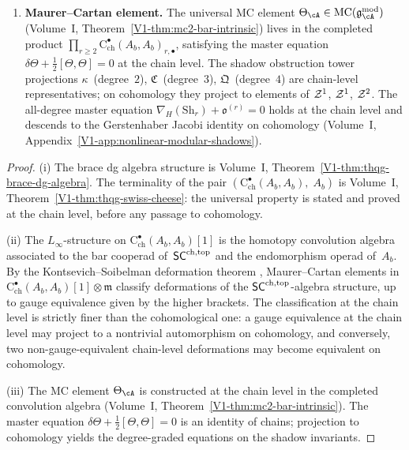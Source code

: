 \begin{theorem}
\begin{enumerate}[label=\textup{(\roman*)}]
\item \textbf{Maurer--Cartan element.}
 The universal MC element\/
 $\Theta_\cA \in \MC(\gAmod)$
 \textup{(}Volume~I,
 Theorem~\textup{\ref*{V1-thm:mc2-bar-intrinsic}}\textup{)}
 lives in the completed product\/
 $\prod_{r \ge 2}
 \mathrm{C}^\bullet_{\mathrm{ch}}(A_b, A_b)_{r,\bullet}$,
 satisfying the master equation
 $\delta \Theta + \tfrac{1}{2}[\Theta, \Theta] = 0$
 at the chain level. The shadow obstruction tower projections
 $\kappa$~\textup{(}degree~$2$\textup{)},
 $\mathfrak{C}$~\textup{(}degree~$3$\textup{)},
 $\mathfrak{Q}$~\textup{(}degree~$4$\textup{)}
 are chain-level representatives\textup{;} on cohomology they
 project to elements of\/ $\mathcal{Z}^1$, $\mathcal{Z}^1$, $\mathcal{Z}^2$.
 The all-degree master equation
 $\nabla_{H}(\mathrm{Sh}_r) + \mathfrak{o}^{(r)} = 0$
 holds at the chain level and descends to the Gerstenhaber Jacobi
 identity on cohomology
 \textup{(}Volume~I, Appendix~\textup{\ref*{V1-app:nonlinear-modular-shadows}}\textup{)}.
\end{enumerate}
\end{theorem}

\begin{proof}
(i) The brace dg algebra structure is
Volume~I, Theorem~\ref*{V1-thm:thqg-brace-dg-algebra}.
The terminality of the pair
$(\mathrm{C}^\bullet_{\mathrm{ch}}(A_b, A_b),\; A_b)$
is Volume~I, Theorem~\ref*{V1-thm:thqg-swiss-cheese}: the
universal property is stated and proved at the chain level,
before any passage to cohomology.

(ii) The $L_\infty$-structure on
$\mathrm{C}^\bullet_{\mathrm{ch}}(A_b, A_b)[1]$ is the
homotopy convolution algebra associated to the bar cooperad
of~$\mathsf{SC}^{\mathrm{ch},\mathrm{top}}$ and the endomorphism operad of~$A_b$. By the
Kontsevich--Soibelman deformation theorem
\cite[Theorem~3.1]{KS09}, Maurer--Cartan elements in
$\mathrm{C}^\bullet_{\mathrm{ch}}(A_b, A_b)[1] \otimes
\mathfrak{m}$ classify deformations of the
$\mathsf{SC}^{\mathrm{ch},\mathrm{top}}$-algebra structure, up to gauge equivalence given
by the higher brackets. The classification at the chain level
is strictly finer than the cohomological one: a gauge
equivalence at the chain level may project to a nontrivial
automorphism on cohomology, and conversely, two non-gauge-equivalent
chain-level deformations may become equivalent on cohomology.

(iii) The MC element $\Theta_\cA$ is constructed at the chain
level in the completed convolution algebra
(Volume~I, Theorem~\ref*{V1-thm:mc2-bar-intrinsic}).
The master equation
$\delta \Theta + \tfrac{1}{2}[\Theta, \Theta] = 0$ is an
identity of chains; projection to cohomology yields the
degree-graded equations on the shadow invariants.
\end{proof}

